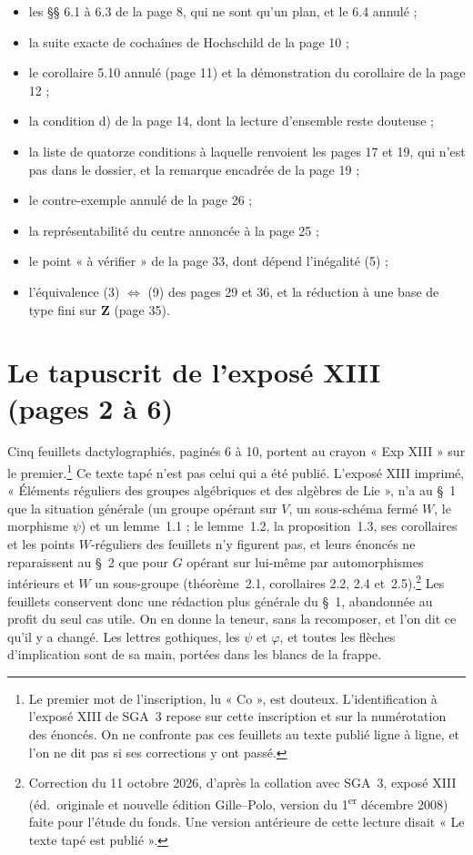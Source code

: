 \documentclass[11pt,a4paper]{article}
\begin{document}
\begin{itemize}
\item les §§ 6.1 à 6.3 de la page 8, qui ne sont qu'un plan, et le 6.4 annulé ;
\item la suite exacte de cochaînes de Hochschild de la page 10 ;
\item le corollaire 5.10 annulé (page 11) et la démonstration du corollaire de
la page 12 ;
\item la condition d) de la page 14, dont la lecture d'ensemble reste
douteuse ;
\item la liste de quatorze conditions à laquelle renvoient les pages 17 et 19,
qui n'est pas dans le dossier, et la remarque encadrée de la page 19 ;
\item le contre-exemple annulé de la page 26 ;
\item la représentabilité du centre annoncée à la page 25 ;
\item le point « à vérifier » de la page 33, dont dépend l'inégalité (5) ;
\item l'équivalence (3) $\Leftrightarrow$ (9) des pages 29 et 36, et la
réduction à une base de type fini sur $\mathbf{Z}$ (page 35).
\end{itemize}

\section*{Le tapuscrit de l'exposé XIII (pages 2 à 6)}

Cinq feuillets dactylographiés, paginés 6 à 10, portent au crayon « Exp XIII »
sur le premier.\footnote{Le premier mot de l'inscription, lu « Co », est
douteux. L'identification à l'exposé XIII de SGA~3 repose sur cette
inscription et sur la numérotation des énoncés. On ne confronte pas ces
feuillets au texte publié ligne à ligne, et l'on ne dit pas si ses
corrections y ont passé.} Ce texte tapé n'est pas celui qui a été publié.
L'exposé XIII imprimé, « Éléments réguliers des groupes algébriques et des
algèbres de Lie », n'a au §~1 que la situation générale (un groupe opérant sur
$V$, un sous-schéma fermé $W$, le morphisme $\psi$) et un lemme~1.1 ; le
lemme~1.2, la proposition~1.3, ses corollaires et les points $W$-réguliers des
feuillets n'y figurent pas, et leurs énoncés ne reparaissent au §~2 que pour
$G$ opérant sur lui-même par automorphismes intérieurs et $W$ un sous-groupe
(théorème~2.1, corollaires 2.2, 2.4 et~2.5).\footnote{Correction du 11 octobre
2026, d'après la collation avec SGA~3, exposé XIII (éd.\ originale et
nouvelle édition Gille--Polo, version du 1\textsuperscript{er} décembre 2008)
faite pour l'étude du fonds. Une version antérieure de cette lecture disait
« Le texte tapé est publié ».} Les feuillets conservent donc une rédaction plus
générale du §~1, abandonnée au profit du seul cas utile. On en donne la teneur,
sans la recomposer, et l'on dit ce qu'il y a changé. Les lettres gothiques, les $\psi$ et
$\varphi$, et toutes les flèches d'implication sont de sa main, portées dans
les blancs de la frappe.
\end{document}
